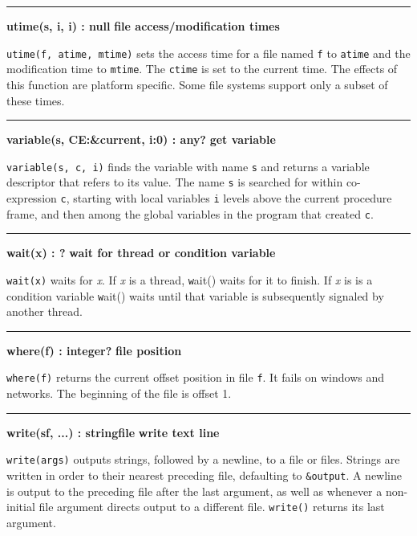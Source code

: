 \bigskip\hrule\vspace{0.1cm}
\noindent
{\bf utime(s, i, i) : null } \hfill {\bf file access/modification times}

\noindent
\texttt{utime(f, atime, mtime)} sets the access
time for a file named \texttt{f} to \texttt{atime} and the modification
time to \texttt{mtime}. The \texttt{ctime} is set to the current time.
The effects of this function are platform specific. Some file systems
support only a subset of these times.

\bigskip\hrule\vspace{0.1cm}
\noindent
{\bf variable(s, CE:\&current, i:0) : any? } \hfill {\bf get variable}

\noindent
{}\texttt{variable(s, c, i)} finds the variable
with name \texttt{s} and returns a variable descriptor that refers to
its value. The name \texttt{s} is searched for within co-expression
\texttt{c}, starting with local variables \texttt{i} levels above the
current procedure frame, and then among the global variables in the
program that created \texttt{c}.

\bigskip\hrule\vspace{0.1cm}
\noindent
{\bf wait(x) : ? } \hfill {\bf wait for thread or condition variable}

\noindent
{}\texttt{wait(x)} waits for {\textit x}. If {\textit x} is
a thread, {\texttt wait()} waits for it to finish. If {\textit x} is
is a condition variable {\texttt wait()} waits until that variable is
subsequently signaled by another thread.

\bigskip\hrule\vspace{0.1cm}
\noindent
{\bf where(f) : integer? } \hfill {\bf file position}

\noindent
{}\texttt{where(f)} returns the
current offset position in file \texttt{f}. It fails on windows and
networks. The beginning of the file is offset 1.

\bigskip\hrule\vspace{0.1cm}
\noindent
{\bf write(s{\textbar}f, ...) : string{\textbar}file } \hfill {\bf write text line}

\noindent
\texttt{write(args)} outputs strings, followed by a newline, to a file
or files. Strings are written in order to their nearest preceding file,
defaulting to \texttt{\&output}. A newline is output to the preceding
file after the last argument, as well as whenever a non-initial file
argument directs output to a different file.
\texttt{write()} returns its last argument.

